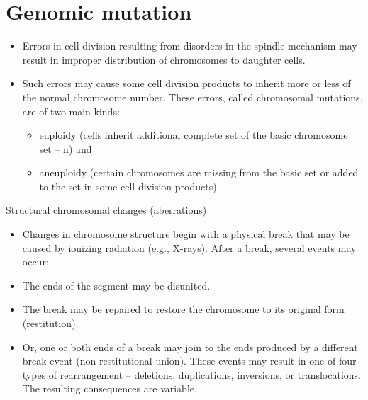 \documentclass[11pt,ignorenonframetext,aspectratio=169]{beamer}
\providecommand{\tightlist}{%
  \setlength{\itemsep}{0pt}\setlength{\parskip}{0pt}}
\begin{document}
\hypertarget{genomic-mutation}{%
\section{Genomic mutation}\label{genomic-mutation}}

\begin{frame}{}
\protect\hypertarget{section-4}{}
\begin{itemize}
\tightlist
\item
  Errors in cell division resulting from disorders in the spindle
  mechanism may result in improper distribution of chromosomes to
  daughter cells.
\item
  Such errors may cause some cell division products to inherit more or
  less of the normal chromosome number. These errors, called chromosomal
  mutations, are of two main kinds:

  \begin{itemize}
  \tightlist
  \item
    euploidy (cells inherit additional complete set of the basic
    chromosome set -- n) and
  \item
    aneuploidy (certain chromosomes are missing from the basic set or
    added to the set in some cell division products).
  \end{itemize}
\end{itemize}
\end{frame}

\begin{frame}{Structural chromosomal changes (aberrations)}
\protect\hypertarget{structural-chromosomal-changes-aberrations}{}
\begin{itemize}
\tightlist
\item
  Changes in chromosome structure begin with a physical break that may
  be caused by ionizing radiation (e.g., X-rays). After a break, several
  events may occur:
\item
  The ends of the segment may be disunited.
\item
  The break may be repaired to restore the chromosome to its original
  form (restitution).
\item
  Or, one or both ends of a break may join to the ends produced by a
  different break event (non-restitutional union). These events may
  result in one of four types of rearrangement -- deletions,
  duplications, inversions, or translocations. The resulting
  consequences are variable.
\end{itemize}
\end{frame}
\end{document}
